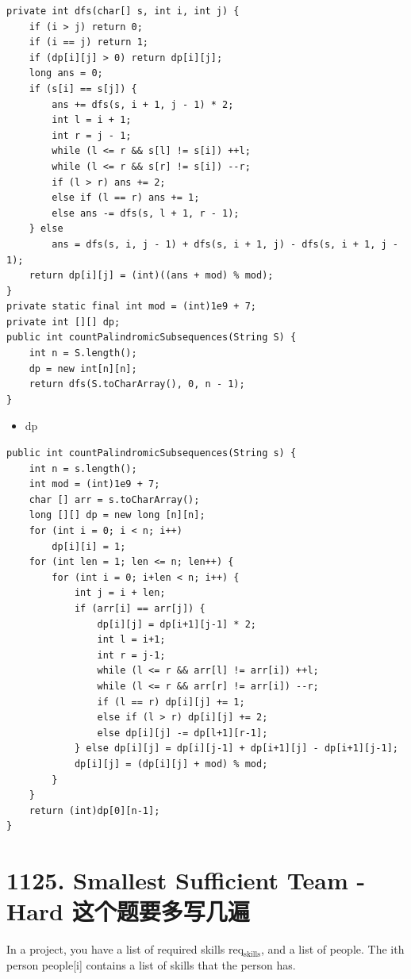 \documentclass[9pt, b5paaper]{book}
\begin{document}
\begin{verbatim}
private int dfs(char[] s, int i, int j) {
    if (i > j) return 0;
    if (i == j) return 1;
    if (dp[i][j] > 0) return dp[i][j];
    long ans = 0;
    if (s[i] == s[j]) {
        ans += dfs(s, i + 1, j - 1) * 2;
        int l = i + 1;
        int r = j - 1;
        while (l <= r && s[l] != s[i]) ++l;
        while (l <= r && s[r] != s[i]) --r;
        if (l > r) ans += 2;
        else if (l == r) ans += 1;
        else ans -= dfs(s, l + 1, r - 1);
    } else 
        ans = dfs(s, i, j - 1) + dfs(s, i + 1, j) - dfs(s, i + 1, j - 1);
    return dp[i][j] = (int)((ans + mod) % mod);
}
private static final int mod = (int)1e9 + 7;
private int [][] dp;
public int countPalindromicSubsequences(String S) {
    int n = S.length();
    dp = new int[n][n];
    return dfs(S.toCharArray(), 0, n - 1);
}
\end{verbatim}
\begin{itemize}
\item dp
\end{itemize}
\begin{verbatim}
public int countPalindromicSubsequences(String s) {
    int n = s.length();
    int mod = (int)1e9 + 7;
    char [] arr = s.toCharArray();
    long [][] dp = new long [n][n];
    for (int i = 0; i < n; i++) 
        dp[i][i] = 1;
    for (int len = 1; len <= n; len++) {
        for (int i = 0; i+len < n; i++) {
            int j = i + len;
            if (arr[i] == arr[j]) {
                dp[i][j] = dp[i+1][j-1] * 2;
                int l = i+1;
                int r = j-1;
                while (l <= r && arr[l] != arr[i]) ++l;
                while (l <= r && arr[r] != arr[i]) --r;
                if (l == r) dp[i][j] += 1;
                else if (l > r) dp[i][j] += 2;
                else dp[i][j] -= dp[l+1][r-1];
            } else dp[i][j] = dp[i][j-1] + dp[i+1][j] - dp[i+1][j-1];
            dp[i][j] = (dp[i][j] + mod) % mod;
        }
    }
    return (int)dp[0][n-1];
}
\end{verbatim}

\section{1125. Smallest Sufficient Team - Hard 这个题要多写几遍}
\label{sec-1-11}
In a project, you have a list of required skills req$_{\text{skills}}$, and a list of people. The ith person people[i] contains a list of skills that the person has.
\end{document}
